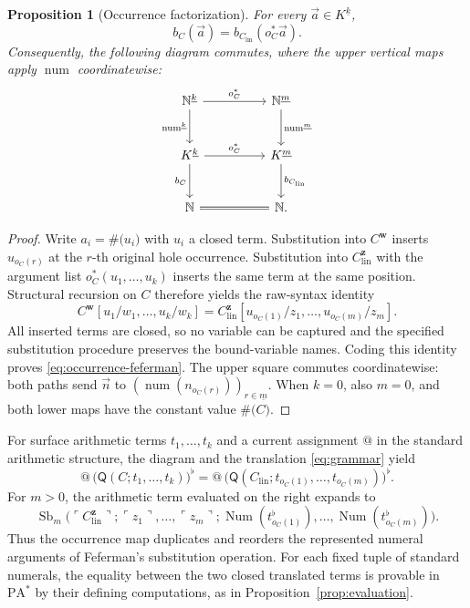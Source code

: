 \documentclass[11pt]{article}
\makeatletter
\newcommand{\atsign}{\mathord{@}}
\newcommand{\finord}[1]{\underline{#1}}
\newcommand{\N}{\mathbb N}
\newcommand{\PA}{\mathrm{PA}^{*}}
\newcommand{\num}{\operatorname{num}}
\newcommand{\Num}{\operatorname{Num}}
\newcommand{\Sb}{\operatorname{Sb}}
\newcommand{\Q}{\mathsf Q}
\newcommand{\code}[1]{\#\bigl(#1\bigr)}
\newcommand{\quo}[1]{\ulcorner #1\urcorner}
\newcommand{\flatof}[1]{\bigl(#1\bigr)^{\flat}}
\newtheorem{proposition}{Proposition}[section]
\theoremstyle{definition}
\makeatother
\begin{document}
\begin{proposition}[Occurrence factorization]\label{prop:occurrence-feferman}
For every $\vec a\in K^{\finord k}$,
\begin{equation}\label{eq:occurrence-feferman}
 b_C(\vec a)=b_{C_{\mathrm{lin}}}(o_C^*\vec a).
\end{equation}
Consequently, the following diagram commutes, where the upper vertical
maps apply $\num$ coordinatewise:
\[
\begin{tikzcd}[column sep=huge,row sep=large]
 \N^{\finord k} \arrow[r,"o_C^*"]
   \arrow[d,"\num^{\finord k}"'] &
 \N^{\finord m} \arrow[d,"\num^{\finord m}"]\\
 K^{\finord k} \arrow[r,"o_C^*"] \arrow[d,"b_C"'] &
 K^{\finord m} \arrow[d,"b_{C_{\mathrm{lin}}}"]\\
 \N \arrow[r,equal] & \N.
\end{tikzcd}
\]
\end{proposition}

\begin{proof}
Write $a_i=\code{u_i}$ with $u_i$ a closed term. Substitution into
$C^{\mathbf w}$ inserts $u_{o_C(r)}$ at the $r$-th original hole
occurrence. Substitution into $C_{\mathrm{lin}}^{\mathbf z}$ with the
argument list $o_C^*(u_1,\ldots,u_k)$ inserts the same term at the same
position. Structural recursion on $C$ therefore yields the raw-syntax
identity
\[
 C^{\mathbf w}[u_1/w_1,\ldots,u_k/w_k]
 =C_{\mathrm{lin}}^{\mathbf z}
     [u_{o_C(1)}/z_1,\ldots,u_{o_C(m)}/z_m].
\]
All inserted terms are closed, so no variable can be captured and the
specified substitution procedure preserves the bound-variable names.
Coding this identity proves \eqref{eq:occurrence-feferman}. The upper
square commutes coordinatewise: both paths send $\vec n$ to
$(\num(n_{o_C(r)}))_{r\in\finord m}$. When $k=0$, also $m=0$,
and both lower maps have the constant value $\code C$.
\end{proof}

For surface arithmetic terms $t_1,\ldots,t_k$ and a current assignment
$\atsign$ in the standard arithmetic structure, the diagram and the
translation \eqref{eq:grammar} yield
\begin{equation}\label{eq:occurrence-feferman-at}
 \atsign\,\flatof{\Q(C;t_1,\ldots,t_k)}
 =\atsign\,\flatof{
       \Q(C_{\mathrm{lin}};t_{o_C(1)},\ldots,t_{o_C(m)})}.
\end{equation}
For $m>0$, the arithmetic term evaluated on the right expands to
\[
 \Sb_m\bigl(\quo{C_{\mathrm{lin}}^{\mathbf z}};
   \quo{z_1},\ldots,\quo{z_m};
   \Num(t_{o_C(1)}^{\flat}),\ldots,
   \Num(t_{o_C(m)}^{\flat})\bigr).
\]
Thus the occurrence map duplicates and reorders the represented numeral
arguments of Feferman's substitution operation. For each fixed tuple of
standard numerals, the equality between the two closed translated terms
is provable in $\PA$ by their defining computations, as in
Proposition~\ref{prop:evaluation}.
\end{document}
